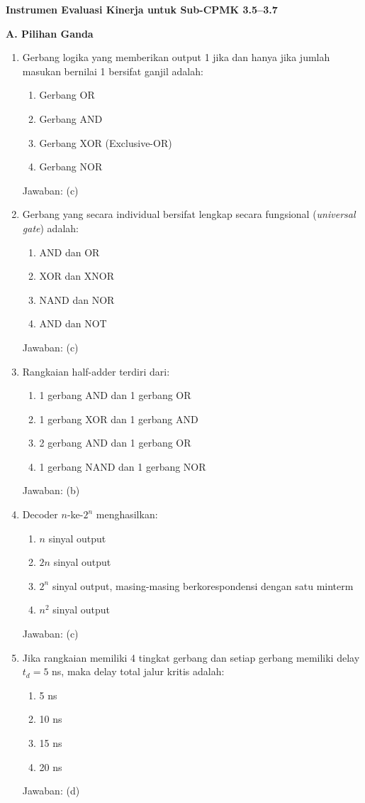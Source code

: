 \documentclass[../main]{subfiles}
\begin{document}
\begin{asesmen}
\textbf{Instrumen Evaluasi Kinerja untuk Sub-CPMK 3.5--3.7}

\textbf{A. Pilihan Ganda}
\begin{enumerate}
  \item Gerbang logika yang memberikan output 1 jika dan hanya jika jumlah masukan bernilai 1 bersifat ganjil adalah:
  \begin{enumerate}
    \item Gerbang OR
    \item Gerbang AND
    \item Gerbang XOR (Exclusive-OR)
    \item Gerbang NOR
  \end{enumerate}
  Jawaban: (c)

  \item Gerbang yang secara individual bersifat lengkap secara fungsional (\textit{universal gate}) adalah:
  \begin{enumerate}
    \item AND dan OR
    \item XOR dan XNOR
    \item NAND dan NOR
    \item AND dan NOT
  \end{enumerate}
  Jawaban: (c)

  \item Rangkaian half-adder terdiri dari:
  \begin{enumerate}
    \item 1 gerbang AND dan 1 gerbang OR
    \item 1 gerbang XOR dan 1 gerbang AND
    \item 2 gerbang AND dan 1 gerbang OR
    \item 1 gerbang NAND dan 1 gerbang NOR
  \end{enumerate}
  Jawaban: (b)

  \item Decoder $n$-ke-$2^n$ menghasilkan:
  \begin{enumerate}
    \item $n$ sinyal output
    \item $2n$ sinyal output
    \item $2^n$ sinyal output, masing-masing berkorespondensi dengan satu minterm
    \item $n^2$ sinyal output
  \end{enumerate}
  Jawaban: (c)

  \item Jika rangkaian memiliki 4 tingkat gerbang dan setiap gerbang memiliki delay $t_d = 5$ ns, maka delay total jalur kritis adalah:
  \begin{enumerate}
    \item 5 ns
    \item 10 ns
    \item 15 ns
    \item 20 ns
  \end{enumerate}
  Jawaban: (d)
\end{enumerate}


\end{asesmen}
\end{document}
